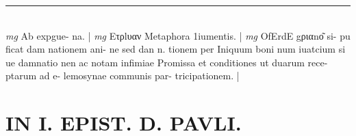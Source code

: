 \documentclass{article}
\begin{document}
\begin{pages}
\vspace{0.5cm}\noindent
\vspace{0.2cm}\rule{1cm}{0.2pt}\\ 
\hspace{0.2cm}\textit{mg}
\footnotesize Ab expgue- na. 
\normalsize| 
\hspace{0.2cm}\textit{mg}
\footnotesize Ετρlυαν Metaphora 1iumentis. 
\normalsize| 
\hspace{0.2cm}\textit{mg}
\footnotesize OfErdE gριαnο͂ si- pu ficat dam  nationem ani- ne sed dan n. tionem per Iniquum boni num iuatcium si ue damnatio nen ac notam infimiae Promissa et conditiones ut duarum rece- ptarum ad e- lemosynae communis par- tricipationem. 
\normalsize| 
\section*{IN I. EPIST. D. PAVLI. }

\end{pages}
\end{document}
